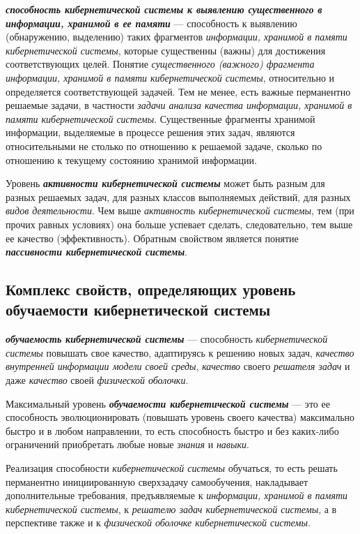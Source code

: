 \textbf{\textit{способность кибернетической системы к выявлению существенного в информации, хранимой в ее памяти}} --- способность к выявлению (обнаружению, выделению) таких фрагментов \textit{информации, хранимой в памяти кибернетической системы}, которые существенны (важны) для достижения соответствующих целей. Понятие \textit{существенного (важного) фрагмента информации, хранимой в памяти кибернетической системы}, относительно и определяется соответствующей задачей. Тем не менее, есть важные перманентно решаемые задачи, в частности \textit{задачи анализа качества информации, хранимой в памяти кибернетической системы}. Существенные фрагменты хранимой информации, выделяемые в процессе решения этих задач, являются относительными не столько по отношению к решаемой задаче, сколько по отношению к текущему состоянию хранимой информации.

Уровень \textbf{\textit{активности кибернетической системы}} может быть разным для разных решаемых задач, для разных классов выполняемых действий, для разных \textit{видов деятельности}. Чем выше \textit{активность кибернетической системы}, тем (при прочих равных условиях) она больше успевает сделать, следовательно, тем выше ее качество (эффективность). Обратным свойством является понятие \textbf{\textit{пассивности кибернетической системы}}. 

\subsection{Комплекс свойств, определяющих уровень обучаемости кибернетической системы}
{\label{sec_cyb_syst_learnability_quality}} 

\textbf{\textit{обучаемость кибернетической системы}} --- способность \textit{кибернетической системы} повышать свое качество, адаптируясь к решению новых задач, \textit{качество внутренней информации модели своей среды}, \textit{качество} своего \textit{решателя задач} и даже \textit{качество} своей \textit{физической оболочки}. 

Максимальный уровень \textbf{\textit{обучаемости кибернетической системы}} --- это ее способность эволюционировать (повышать уровень своего качества) максимально быстро и в любом направлении, то есть способность быстро и без каких-либо ограничений приобретать любые новые \textit{знания} и \textit{навыки}.

Реализация способности \textit{кибернетической системы} обучаться, то есть решать перманентно инициированную сверхзадачу самообучения, накладывает дополнительные требования, предъявляемые к \textit{информации, хранимой в памяти кибернетической системы}, к \textit{решателю задач кибернетической системы}, а в перспективе также и к \textit{физической оболочке кибернетической системы}.


